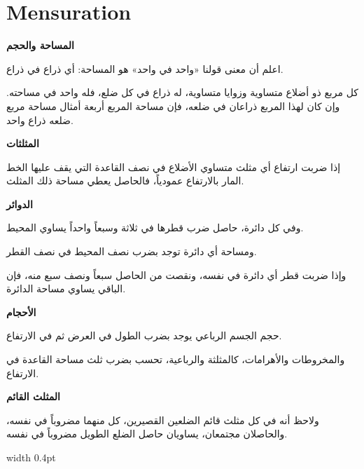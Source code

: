 \documentclass[11pt,a4paper]{book}
\begin{document}
\newpage

\chapter{Mensuration}
\label{ch:mensuration}

\noindent\begin{minipage}[t]{0.48\textwidth}
\raggedleft

\begin{Arabic}
\textbf{المساحة والحجم}

اعلم أن معنى قولنا «واحد في واحد» هو المساحة: أي ذراع في ذراع.

كل مربع ذو أضلاع متساوية وزوايا متساوية، له ذراع في كل ضلع، فله واحد في مساحته. وإن كان لهذا المربع ذراعان في ضلعه، فإن مساحة المربع أربعة أمثال مساحة مربع ضلعه ذراع واحد.

\textbf{المثلثات}

إذا ضربت ارتفاع أي مثلث متساوي الأضلاع في نصف القاعدة التي يقف عليها الخط المار بالارتفاع عمودياً، فالحاصل يعطي مساحة ذلك المثلث.

\textbf{الدوائر}

وفي كل دائرة، حاصل ضرب قطرها في ثلاثة وسبعاً واحداً يساوي المحيط.

ومساحة أي دائرة توجد بضرب نصف المحيط في نصف القطر.

وإذا ضربت قطر أي دائرة في نفسه، ونقصت من الحاصل سبعاً ونصف سبع منه، فإن الباقي يساوي مساحة الدائرة.

\textbf{الأحجام}

حجم الجسم الرباعي يوجد بضرب الطول في العرض ثم في الارتفاع.

والمخروطات والأهرامات، كالمثلثة والرباعية، تحسب بضرب ثلث مساحة القاعدة في الارتفاع.

\textbf{المثلث القائم}

ولاحظ أنه في كل مثلث قائم الضلعين القصيرين، كل منهما مضروباً في نفسه، والحاصلان مجتمعان، يساويان حاصل الضلع الطويل مضروباً في نفسه.
\end{Arabic}

\end{minipage}%
\hfill\vrule width 0.4pt\hfill
\end{document}
